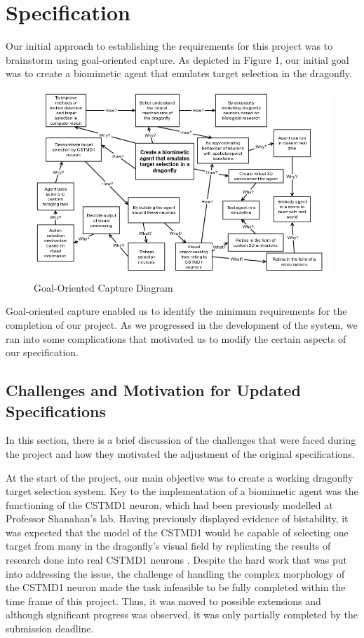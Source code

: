\documentclass[a4paper,11pt]{article}
\begin{document}
\section{Specification}

Our initial approach to establishing the requirements for this project was to brainstorm using goal-oriented capture. As depicted in Figure 1, our initial goal was to create a biomimetic agent that emulates target selection in the dragonfly. 
	
	\begin{figure}[h]
	\begin{center}
	\includegraphics[scale = 0.5]{goalorient}
	\end{center}
	\caption{Goal-Oriented Capture Diagram}
	\end{figure}	
	
	Goal-oriented capture enabled us to identify the minimum requirements for the completion of our project. As we progressed in the development of the system, we ran into some complications that motivated us to modify the certain aspects of our specification.
	 
\subsection{Challenges and Motivation for Updated Specifications}
In this section, there is a brief discussion of the challenges that were faced during the project and how they motivated the adjustment of the original specifications.

	At the start of the project, our main objective was to create a working dragonfly target selection system. Key to the implementation of a biomimetic agent was the functioning of the CSTMD1 neuron, which had been previously modelled at Professor Shanahan's lab. Having previously displayed evidence of bistability, it was expected that the model of the CSTMD1 would be capable of selecting one target from many in the dragonfly's visual field by replicating the results of research done into real CSTMD1 neurons \cite{w13}. Despite the hard work that was put into addressing the issue, the challenge of handling the complex morphology of the CSTMD1 neuron made the task infeasible to be fully completed within the time frame of this project. Thus, it was moved to possible extensions and although significant progress was observed, it was only partially completed by the submission deadline.
	
\end{document}
